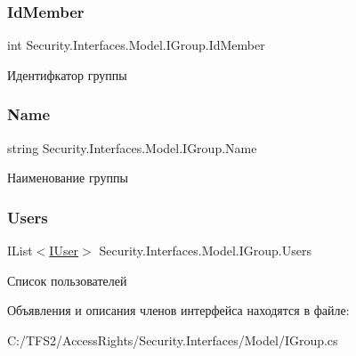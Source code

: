 \subsubsection{\texorpdfstring{Id\+Member}{IdMember}}
{\footnotesize\ttfamily int Security.\+Interfaces.\+Model.\+I\+Group.\+Id\+Member\hspace{0.3cm}{\ttfamily [get]}}



Идентифкатор группы 

\mbox{\label{interface_security_1_1_interfaces_1_1_model_1_1_i_group_a061a1543ccf90cf6a5af6684a1f37988}} 
\subsubsection{\texorpdfstring{Name}{Name}}
{\footnotesize\ttfamily string Security.\+Interfaces.\+Model.\+I\+Group.\+Name\hspace{0.3cm}{\ttfamily [get]}}



Наименование группы 

\mbox{\label{interface_security_1_1_interfaces_1_1_model_1_1_i_group_a5b0fa019ebbaad5398f96af0b3e1ab32}} 
\subsubsection{\texorpdfstring{Users}{Users}}
{\footnotesize\ttfamily I\+List$<$\hyperlink{interface_security_1_1_interfaces_1_1_model_1_1_i_user}{I\+User}$>$ Security.\+Interfaces.\+Model.\+I\+Group.\+Users\hspace{0.3cm}{\ttfamily [get]}}



Список пользователей 



Объявления и описания членов интерфейса находятся в файле\+:\begin{DoxyCompactItemize}
\item 
C\+:/\+T\+F\+S2/\+Access\+Rights/\+Security.\+Interfaces/\+Model/I\+Group.\+cs\end{DoxyCompactItemize}
